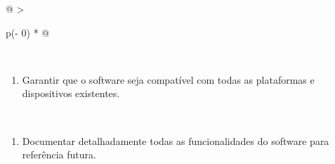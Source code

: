 \documentclass[
]{book}
\providecommand{\tightlist}{%
  \setlength{\itemsep}{0pt}\setlength{\parskip}{0pt}}
\begin{document}
\begin{longtable}[]{@{}
  >{\raggedright\arraybackslash}p{(\columnwidth - 0\tabcolsep) * }@{}}
\begin{minipage}[t]{\linewidth}
\begin{enumerate}
\end{enumerate}
\end{minipage} \\
\begin{minipage}[t]{\linewidth}\raggedright
\begin{enumerate}
\def\labelenumi{\alph{enumi})}
\setcounter{enumi}{3}
\tightlist
\item
  Garantir que o software seja compatível com todas as plataformas e dispositivos existentes.
\end{enumerate}
\end{minipage} \\
\begin{minipage}[t]{\linewidth}\raggedright
\begin{enumerate}
\def\labelenumi{\alph{enumi})}
\setcounter{enumi}{4}
\tightlist
\item
  Documentar detalhadamente todas as funcionalidades do software para referência futura.
\end{enumerate}
\end{minipage} \\
\end{longtable}
\end{document}
